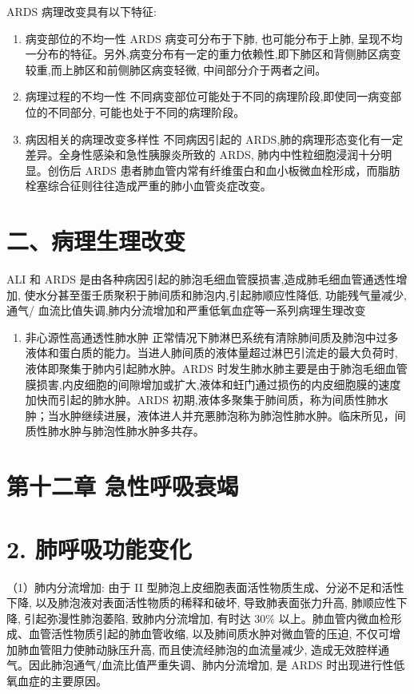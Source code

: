 \documentclass[10pt]{article}
\begin{document}
ARDS 病理改变具有以下特征:

\begin{enumerate}
  \item 病变部位的不均一性 ARDS 病变可分布于下肺, 也可能分布于上肺, 呈现不均一分布的特征。另外,病变分布有一定的重力依赖性,即下肺区和背侧肺区病变较重,而上肺区和前侧肺区病变轻微, 中间部分介于两者之间。

  \item 病理过程的不均一性 不同病变部位可能处于不同的病理阶段,即使同一病变部位的不同部分, 可能也处于不同的病理阶段。

  \item 病因相关的病理改变多样性 不同病因引起的 ARDS,肺的病理形态变化有一定差异。全身性感染和急性胰腺炎所致的 ARDS, 肺内中性粒细胞浸润十分明显。创伤后 ARDS 患者肺血管内常有纤维蛋白和血小板微血栓形成，而脂肪栓塞综合征则往往造成严重的肺小血管炎症改变。

\end{enumerate}

\section*{二、病理生理改变}
ALI 和 ARDS 是由各种病因引起的肺泡毛细血管膜损害,造成肺毛细血管通透性增加, 使水分甚至蛋壬质聚积于肺间质和肺泡内,引起肺顺应性降低, 功能残气量减少, 通气/ 血流比值失调,肺内分流增加和严重低氧血症等一系列病理生理改变

\begin{enumerate}
  \item 非心源性高通透性肺水肿 正常情况下肺淋巴系统有清除肺间质及肺泡中过多液体和蛋白质的能力。当进人肺间质的液体量超过淋巴引流歨的最大负荷时, 液体即聚集于肺内引起肺水肿。ARDS 时发生肺水肺主要是由于肺泡毛细血管膜损害,内皮细胞的间隙增加或扩大,液体和蚟门通过损伤的内皮细胞膜的速度加快而引起的肺水肿。ARDS 初期,液体多聚集于肺间质，称为间质性肺水肿；当水肿继续进展，液体进人并充悪肺泡称为肺泡性肺水肿。临床所见，间质性肺水肿与肺泡性肺水肿多共存。
\end{enumerate}

\section*{第十二章 急性呼吸衰竭}
\section*{2. 肺呼吸功能变化}
（1）肺内分流增加: 由于 II 型肺泡上皮细胞表面活性物质生成、分泌不足和活性下降, 以及肺泡液对表面活性物质的稀释和破坏, 导致肺表面张力升高, 肺顺应性下降, 引起弥漫性肺泡萎陷, 致肺内分流增加, 有时达 $30 \%$ 以上。肺血管内微血检形成、血管活性物质引起的肺血管收缩, 以及肺间质水肿对微血管的压迫, 不仅可增加肺血管阻力使肺动脉压升高, 而且使流经肺泡的血流量减少, 造成无效腔样通气。因此肺泡通气/血流比值严重失调、肺内分流增加, 是 ARDS 时出现进行性低氧血症的主要原因。
\end{document}
